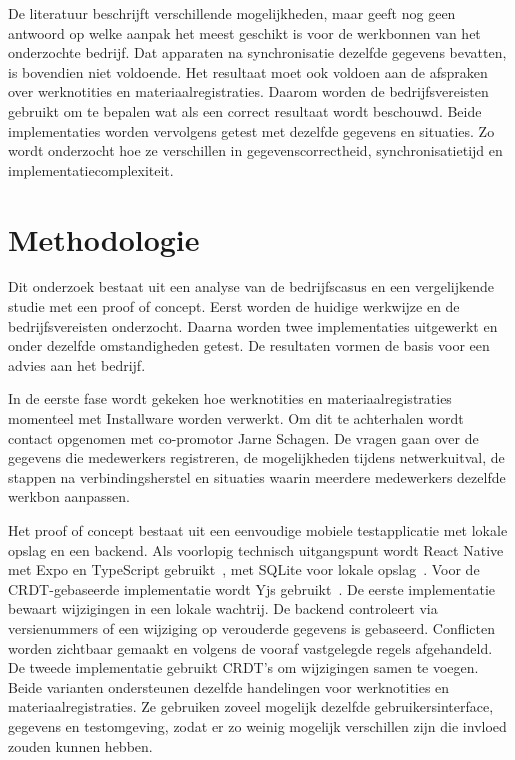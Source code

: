 De literatuur beschrijft verschillende mogelijkheden, maar geeft nog geen antwoord op welke aanpak het meest geschikt is
voor de werkbonnen van het onderzochte bedrijf. Dat apparaten na synchronisatie dezelfde gegevens bevatten, is bovendien niet
voldoende. Het resultaat moet ook voldoen aan de afspraken over werknotities en materiaalregistraties. Daarom worden de
bedrijfsvereisten gebruikt om te bepalen wat als een correct resultaat wordt beschouwd. Beide implementaties worden vervolgens
getest met dezelfde gegevens en situaties. Zo wordt onderzocht hoe ze verschillen in gegevenscorrectheid, synchronisatietijd
en implementatiecomplexiteit.

\section{Methodologie}%
\label{sec:methodologie}

Dit onderzoek bestaat uit een analyse van de bedrijfscasus en een vergelijkende studie met een proof of concept.
Eerst worden de huidige werkwijze en de bedrijfsvereisten onderzocht. Daarna worden twee implementaties
uitgewerkt en onder dezelfde omstandigheden getest. De resultaten vormen de basis voor een advies aan het bedrijf.

In de eerste fase wordt gekeken hoe werknotities en materiaalregistraties momenteel met Installware worden verwerkt.
Om dit te achterhalen wordt contact opgenomen met co-promotor Jarne Schagen. De vragen gaan over de gegevens die medewerkers
registreren, de mogelijkheden tijdens netwerkuitval, de stappen
na verbindingsherstel en situaties waarin meerdere medewerkers dezelfde werkbon aanpassen.

Het proof of concept bestaat uit een eenvoudige mobiele testapplicatie met lokale opslag en een backend.
Als voorlopig technisch uitgangspunt wordt React Native met Expo en
TypeScript gebruikt~\autocite{ReactNativeTypeScript}, met SQLite voor lokale opslag~\autocite{ExpoSQLite}. Voor de
CRDT-gebaseerde implementatie wordt Yjs gebruikt~\autocite{YjsDocumentation}. De eerste implementatie bewaart wijzigingen in een lokale
wachtrij. De backend controleert via versienummers of een wijziging op verouderde gegevens is gebaseerd. Conflicten worden
zichtbaar gemaakt en volgens de vooraf vastgelegde regels afgehandeld. De tweede implementatie gebruikt CRDT's om wijzigingen
samen te voegen. Beide varianten ondersteunen dezelfde handelingen voor werknotities en materiaalregistraties. Ze gebruiken
zoveel mogelijk dezelfde gebruikersinterface, gegevens en testomgeving, zodat er zo weinig mogelijk verschillen zijn die invloed zouden kunnen hebben.

